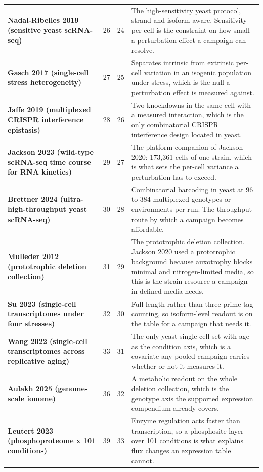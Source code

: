 \begin{longtable}{@{}L{46mm} r@{\hspace{6pt}} r@{\hspace{6pt}} L{104mm}@{}}
\addlinespace[5pt]
\textbf{Nadal-Ribelles 2019 (sensitive yeast scRNA-seq)} & 26 & 24 & The high-sensitivity yeast protocol, strand and isoform aware. Sensitivity per cell is the constraint on how small a perturbation effect a campaign can resolve. \\
\addlinespace[5pt]
\textbf{Gasch 2017 (single-cell stress heterogeneity)} & 27 & 25 & Separates intrinsic from extrinsic per-cell variation in an isogenic population under stress, which is the null a perturbation effect is measured against. \\
\addlinespace[5pt]
\textbf{Jaffe 2019 (multiplexed CRISPR interference epistasis)} & 28 & 26 & Two knockdowns in the same cell with a measured interaction, which is the only combinatorial CRISPR interference design located in yeast. \\
\addlinespace[5pt]
\textbf{Jackson 2023 (wild-type scRNA-seq time course for RNA kinetics)} & 29 & 27 & The platform companion of Jackson 2020: 173,361 cells of one strain, which is what sets the per-cell variance a perturbation has to exceed. \\
\addlinespace[5pt]
\textbf{Brettner 2024 (ultra-high-throughput yeast scRNA-seq)} & 30 & 28 & Combinatorial barcoding in yeast at 96 to 384 multiplexed genotypes or environments per run. The throughput route by which a campaign becomes affordable. \\
\addlinespace[5pt]
\textbf{Mulleder 2012 (prototrophic deletion collection)} & 31 & 29 & The prototrophic deletion collection. Jackson 2020 used a prototrophic background because auxotrophy blocks minimal and nitrogen-limited media, so this is the strain resource a campaign in defined media needs. \\
\addlinespace[5pt]
\textbf{Su 2023 (single-cell transcriptomes under four stresses)} & 32 & 30 & Full-length rather than three-prime tag counting, so isoform-level readout is on the table for a campaign that needs it. \\
\addlinespace[5pt]
\textbf{Wang 2022 (single-cell transcriptomes across replicative aging)} & 33 & 31 & The only yeast single-cell set with age as the condition axis, which is a covariate any pooled campaign carries whether or not it measures it. \\
\addlinespace[5pt]
\textbf{Aulakh 2025 (genome-scale ionome)} & 36 & 32 & A metabolic readout on the whole deletion collection, which is the genotype axis the supported expression compendium already covers. \\
\addlinespace[5pt]
\textbf{Leutert 2023 (phosphoproteome x 101 conditions)} & 39 & 33 & Enzyme regulation acts faster than transcription, so a phosphosite layer over 101 conditions is what explains flux changes an expression table cannot. \\

\end{longtable}
